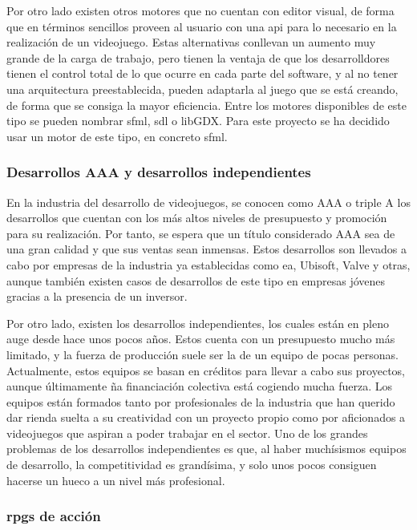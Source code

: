 			Por otro lado existen otros motores que no cuentan con editor visual, de forma que en términos sencillos proveen al usuario con una \acrshort{api} para lo necesario en la realización de un videojuego. Estas alternativas conllevan un aumento muy grande de la carga de trabajo, pero tienen la ventaja de que los desarrolldores tienen el control total de lo que ocurre en cada parte del software, y al no tener una arquitectura preestablecida, pueden adaptarla al juego que se está creando, de forma que se consiga la mayor eficiencia. Entre los motores disponibles de este tipo se pueden nombrar \acrshort{sfml}, \acrshort{sdl} o libGDX. Para este proyecto se ha decidido usar un motor de este tipo, en concreto \acrshort{sfml}.

		\subsubsection{Desarrollos AAA y desarrollos independientes}

			En la industria del desarrollo de videojuegos, se conocen como AAA o triple A los desarrollos que cuentan con los más altos niveles de presupuesto y promoción para su realización. Por tanto, se espera que un título considerado AAA sea de una gran calidad y que sus ventas sean inmensas. Estos desarrollos son llevados a cabo por empresas de la industria ya establecidas como \acrshort{ea}, Ubisoft, Valve y otras, aunque también existen casos de desarrollos de este tipo en empresas jóvenes gracias a la presencia de un inversor.

			Por otro lado, existen los desarrollos independientes, los cuales están en pleno auge desde hace unos pocos años. Estos cuenta con un presupuesto mucho más limitado, y la fuerza de producción suele ser la de un equipo de pocas personas. Actualmente, estos equipos se basan en créditos para llevar a cabo sus proyectos, aunque últimamente ña financiación colectiva está cogiendo mucha fuerza. Los equipos están formados tanto por profesionales de la industria que han querido dar rienda suelta a su creatividad con un proyecto propio como por aficionados a videojuegos que aspiran a poder trabajar en el sector. Uno de los grandes problemas de los desarrollos independientes es que, al haber muchísismos equipos de desarrollo, la competitividad es grandísima, y solo unos pocos consiguen hacerse un hueco a un nivel más profesional.

		\subsubsection{\acrshort{rpg}s de acción}

